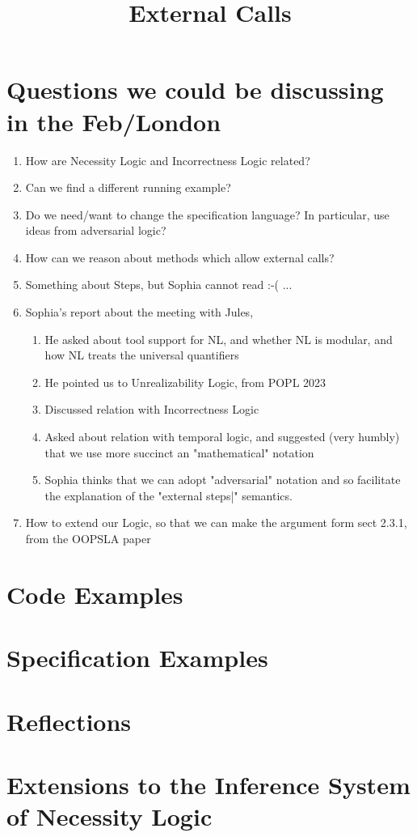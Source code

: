 \documentclass[11pt]{article} %
\title{External Calls}
\date{} %
\theoremstyle{definition}
\begin{document}
\maketitle

\section{Questions we could be discussing in the Feb/London}

\begin{enumerate}
\item
How are Necessity Logic and Incorrectness Logic related?
\item
Can we find a different running example?
\item
Do we need/want to change  the specification language? In particular, use ideas from adversarial logic?
\item
How can we reason about methods which allow external calls?
\item
Something about Steps, but Sophia cannot read :-( ...
\item
Sophia's report about the meeting with Jules, 
\begin{enumerate}
\item 
He asked about tool support for NL, and whether NL is modular, and how NL treats the universal quantifiers 
\item
He pointed us to Unrealizability  Logic, from POPL 2023
\item
Discussed relation with Incorrectness Logic
\item
Asked about relation with temporal logic, and suggested (very humbly) that we use more succinct an "mathematical" notation
\item
Sophia thinks that we can adopt "adversarial" notation and so facilitate the explanation of the "external steps|" semantics.
\end{enumerate}
\item
How to extend our Logic, so that we can make the argument form sect 2.3.1, from the OOPSLA paper
\end{enumerate}

\section{Code Examples}


\section{Specification Examples}


\section{Reflections}


\section{Extensions to the Inference System of Necessity Logic}

\end{document}
